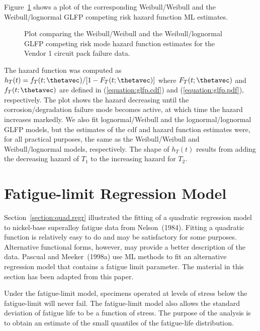 Figure~\ref{figure:vendor1.hazard.ps} shows a plot of the
corresponding Weibull/Weibull and the Weibull/lognormal GLFP
competing risk hazard function ML estimates.
\begin{figure}
\caption{Plot comparing the Weibull/Weibull and the
Weibull/lognormal GLFP competing risk mode hazard function estimates
for the Vendor 1 circuit pack failure data.}
\label{figure:vendor1.hazard.ps}
\end{figure}
The hazard function
was computed as $h_{T}(t)=f_{T}(t;\thetavec)/[1-
F_{T}(t;\thetavec)]$ where $F_{T}(t;\thetavec)$ and
$f_{T}(t;\thetavec)$ are defined in (\ref{equation:glfp.cdf}) and
(\ref{equation:glfp.pdf}), respectively. The plot shows the hazard
decreasing until the corrosion/degradation failure mode becomes
active, at which time the hazard increases markedly. We also fit
lognormal/Weibull and the lognormal/lognormal GLFP models, but the
estimates of the cdf and hazard function estimates were, for all
practical purposes, the same as the Weibull/Weibull and
Weibull/lognormal models, respectively. The shape of $h_{T}(t)$
results from adding the decreasing hazard of $T_{1}$ to the increasing
hazard for $T_{2}$.

\section{Fatigue-limit Regression Model}
\label{section:fatigue.limit.model}

 
Section~\ref{section:quad.regr} illustrated the fitting of a
quadratic regression model to nickel-base superalloy fatigue data
from Nelson~(1984).  Fitting a quadratic function is relatively easy
to do and may be satisfactory for some purposes.  Alternative
functional forms, however, may provide a better description of the
data. Pascual and Meeker~(1998a) use ML methods to
fit an alternative regression model that contains a fatigue limit
parameter. The material in this section has been adapted from this
paper.

Under the fatigue-limit model, specimens operated at levels of
stress below the fatigue-limit will never fail.  The fatigue-limit
model also allows the standard deviation of fatigue life to be a
function of stress.  The purpose of the analysis is to obtain an
estimate of the small quantiles of the fatigue-life distribution.

